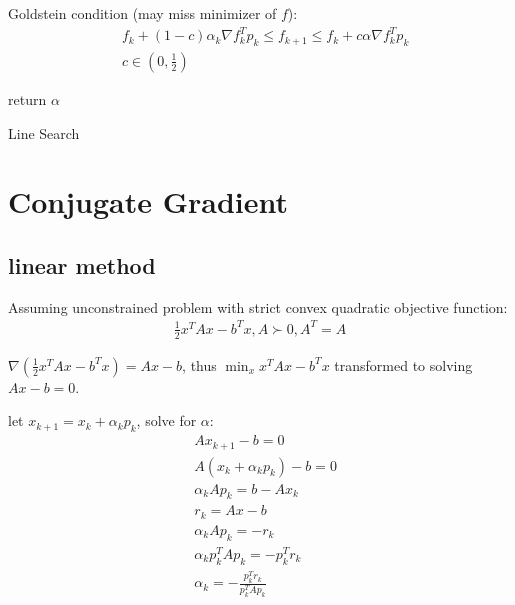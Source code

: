 \documentclass[8pt,letter]{article}
\begin{document}
\begin{multicols*}{2}
  Goldstein condition (may miss minimizer of $f$):
  \begin{align}
    &f_k+(1-c) \alpha_k \nabla f_k^T p_k \leq f_{k+1} \leq f_k + c \alpha \nabla f_k^T p_k\\
    &c \in (0,\frac{1}{2})
  \end{align}
  
  \begin{algorithm}[H]
    return $\alpha$
    \caption{Line Search\label{Algo_LineSearch}}
  \end{algorithm}
  

  \section{Conjugate Gradient}

  \subsection{linear method}
  Assuming unconstrained problem with strict convex quadratic objective function:
  \begin{align*}
    \frac{1}{2} x^TAx-b^Tx, A \succ 0, A^T=A
  \end{align*}


  $\nabla(\frac{1}{2} x^TAx-b^Tx) = Ax-b$, thus $\min_x x^TAx - b^Tx$ transformed to solving $Ax-b=0$. 

  let $x_{k+1} = x_k + \alpha_k p_k$, solve for $\alpha$:
  \begin{align*}
    &Ax_{k+1}-b=0\\
    &A(x_k+\alpha_k p_k) - b=0\\
    &\alpha_k A p_k = b - Ax_k\\
    &r_k = Ax-b\\
    &\alpha_k A p_k = -r_k\\
    &\alpha_k p_k^T A p_k = - p_k^T r_k\\
    &\alpha_k = - \frac{p_k^T r_k}{p_k^T A p_k}
  \end{align*}
  

\end{multicols*}
\end{document}
